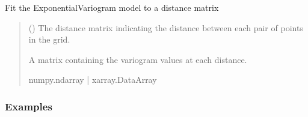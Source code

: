 \documentclass[letterpaper,10pt,english]{sphinxmanual}
\begin{document}
\begin{fulllineitems}
\begin{quote}
\begin{description}
\begin{itemize}
\end{itemize}

\end{description}\end{quote}

\begin{fulllineitems}
\label{\detokenize{covariance:glomar_gridding.variogram.ExponentialVariogram.fit}}
\pysigstartsignatures
\pysiglinewithargsret
{}
{}
{}
\pysigstopsignatures
\sphinxAtStartPar
Fit the ExponentialVariogram model to a distance matrix
\begin{quote}\begin{description}
\sphinxAtStartPar
{} (\sphinxstyleliteralemphasis{\sphinxupquote{ | }}) \textendash{} The distance matrix indicating the distance between each pair of
points in the grid.

\sphinxAtStartPar
A matrix containing the variogram values at each distance.

\sphinxAtStartPar
numpy.ndarray | xarray.DataArray

\end{description}\end{quote}
\subsubsection*{Examples}

\begin{sphinxVerbatim}[commandchars=\\\{\}]
  
\end{sphinxVerbatim}

\end{fulllineitems}


\end{fulllineitems}
\end{document}
